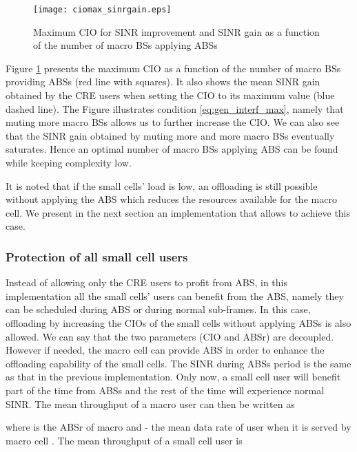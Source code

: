 \documentclass[conference]{IEEEtran}
\begin{document}
\begin{figure}[!ht]
\centering
\texttt{[image: ciomax\_sinrgain.eps]}
\caption{Maximum CIO for SINR improvement and SINR gain as a function of the number of macro \acp{BS} applying \acp{ABS}}
\label{fig:max_cio_evolution}
\end{figure}

	Figure \ref{fig:max_cio_evolution} presents the maximum \ac{CIO} as a function of the number of macro \acp{BS} providing \acp{ABS} (red line with squares). It also shows the mean \ac{SINR} gain obtained by the \ac{CRE} users when setting the \ac{CIO} to its maximum value (blue dashed line). The Figure illustrates condition \eqref{eq:gen_interf_max}, namely that muting more macro \acp{BS} allows us to further increase the \ac{CIO}. We can also see that the \ac{SINR} gain obtained by muting more and more macro \acp{BS} eventually saturates. Hence an optimal number of macro \acp{BS} applying \ac{ABS} can be found while keeping complexity low.	
	
	It is noted that if the small cells' load is low, an offloading is still possible without applying the \ac{ABS} which reduces the resources available for the macro cell. We present in the next section an implementation that allows to achieve this case.
	
\subsubsection{Protection of all small cell users}\label{NonProtectedCase}
	Instead of allowing only the \ac{CRE} users to profit from \ac{ABS}, in this implementation all the small cells' users can benefit from the \ac{ABS}, namely they can be scheduled during \ac{ABS} or during normal sub-frames. In this case, offloading by increasing the \acp{CIO} of the small cells without applying \acp{ABS} is also allowed. We can say that the two parameters (\ac{CIO} and \ac{ABSr}) are decoupled. However if needed, the macro cell can provide \ac{ABS} in order to enhance the offloading capability of the small cells. The \ac{SINR} during \acp{ABS} period is the same as that in the previous implementation. Only now, a small cell user will benefit part of the time from \acp{ABS} and the rest of the time will experience normal \ac{SINR}. The mean throughput of a macro user can then be written as
	
where  is the \ac{ABSr} of macro  and  - the mean data rate of user  when it is served by macro cell .
The mean throughput of a small cell user is
	
\end{document}
